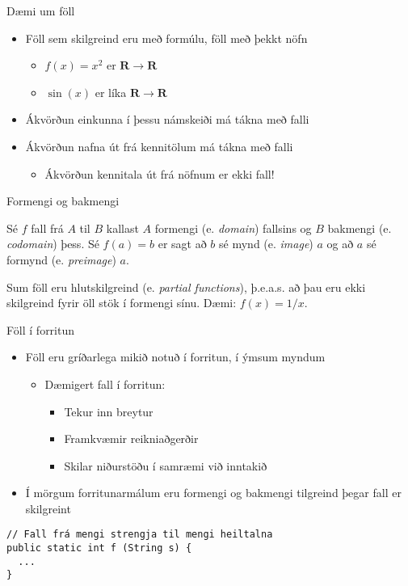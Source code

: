\documentclass[handout]{beamer}
\begin{document}
\begin{frame}{Dæmi um föll}
\begin{itemize}
 \item Föll sem skilgreind eru með formúlu, föll með þekkt nöfn
 \begin{itemize}
  \item $f(x) = x^2$ er $\mathbf{R} \to \mathbf{R}$
  \item $\sin(x)$ er líka $\mathbf{R} \to \mathbf{R}$
 \end{itemize}
 \item Ákvörðun einkunna í þessu námskeiði má tákna með falli
 \item Ákvörðun nafna út frá kennitölum má tákna með falli \pause
 \begin{itemize}
  \item Ákvörðun kennitala út frá nöfnum er ekki fall!
 \end{itemize}
\end{itemize}
\end{frame}

\begin{frame}{Formengi og bakmengi}
\begin{tcolorbox}[title=Formengi og bakmengi]
Sé $f$ fall frá $A$ til $B$ kallast $A$ formengi (e. \emph{domain}) fallsins og $B$ bakmengi (e. \emph{codomain}) þess. Sé $f(a) = b$ er sagt að $b$ sé mynd (e. \emph{image}) $a$ og að $a$ sé formynd (e. \emph{preimage}) $a$.
\end{tcolorbox}
Sum föll eru hlutskilgreind (e. \emph{partial functions}), þ.e.a.s. að þau eru ekki skilgreind fyrir öll stök í formengi sínu. Dæmi: $f(x) = 1/x$.
\end{frame}

\begin{frame}[fragile]{Föll í forritun}
\begin{itemize}
 \item Föll eru gríðarlega mikið notuð í forritun, í ýmsum myndum
 \begin{itemize}
  \item Dæmigert fall í forritun:
  \begin{itemize}
   \item Tekur inn breytur
   \item Framkvæmir reikniaðgerðir
   \item Skilar niðurstöðu í samræmi við inntakið 
  \end{itemize}
 \end{itemize}
 \item Í mörgum forritunarmálum eru formengi og bakmengi tilgreind þegar fall er skilgreint
\end{itemize}
\begin{verbatim}
// Fall frá mengi strengja til mengi heiltalna
public static int f (String s) {
  ...
}
\end{verbatim}

\end{frame}
\end{document}
